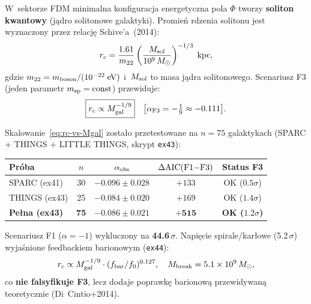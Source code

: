 \begin{proposition}%
\label{prop:soliton-schive}
W~sektorze FDM minimalna konfiguracja energetyczna pola $\Phi$
tworzy \textbf{soliton kwantowy} (j\k{a}dro solitonowe galaktyki).
Promie\'n rdzenia solitonu jest wyznaczony przez relacj\k{e}
Schive'a~(2014):
\begin{equation}\label{eq:schive-rc}
  r_c = \frac{1.61}{m_{22}}
    \left(\frac{M_{\rm sol}}{10^9\,M_\odot}\right)^{-1/3}\;\mathrm{kpc},
\end{equation}
gdzie $m_{22} = m_{\rm boson}/(10^{-22}\;\mathrm{eV})$ i~$M_{\rm sol}$
to masa j\k{a}dra solitonowego. Scenariusz F3 (jeden parametr
$m_{\rm sp} = \mathrm{const}$) przewiduje:
\begin{equation}\label{eq:rc-vs-Mgal}
  \boxed{r_c \propto M_{\rm gal}^{-1/9}}
  \quad\bigl[\alpha_{\rm F3} = -\tfrac{1}{9} \approx -0.111\bigr].
\end{equation}
\end{proposition}

\begin{remark}%
\label{rem:k18-verification}
Skalowanie~\eqref{eq:rc-vs-Mgal} zosta\l{}o przetestowane na
$n = 75$ galaktykach (SPARC + THINGS + LITTLE THINGS, skrypt
\texttt{ex43}):
\begin{center}
\begin{tabular}{lcccc}
\toprule
Pr\'oba & $n$ & $\alpha_{\rm obs}$ & $\Delta{\rm AIC}({\rm F1{-}F3})$
  & Status F3 \\
\midrule
SPARC (ex41) & 30 & $-0.096\pm0.028$ & $+133$ & OK ($0.5\sigma$) \\
THINGS (ex43) & 25 & $-0.084\pm0.020$ & $+169$ & OK ($1.4\sigma$) \\
\textbf{Pe\l{}na (ex43)} & \textbf{75} & $\mathbf{-0.086\pm0.021}$
  & $\mathbf{+515}$ & \textbf{OK ($1.2\sigma$)} \\
\bottomrule
\end{tabular}
\end{center}
Scenariusz F1 ($\alpha = -1$) wykluczony na \textbf{44.6\,$\sigma$}.
Napi\k{e}cie spirale/kar\l{}owe (5.2\,$\sigma$) wyja\'snione
feedbackiem barionowym (\texttt{ex44}):
\begin{equation}
  r_c \propto M_{\rm gal}^{-1/9}\cdot (f_{\rm bar}/f_0)^{0.127},
  \quad M_{\rm break} = 5.1\times10^9\,M_\odot,
\end{equation}
co \textbf{nie falsyfikuje F3}, lecz dodaje poprawk\k{e} barionow\k{a}
przewidywan\k{a} teoretycznie (Di~Cintio+2014).
\end{remark}

